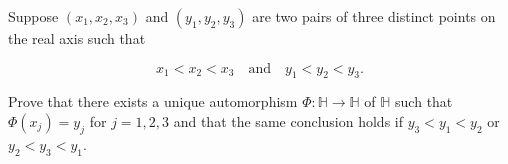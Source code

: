 Suppose $(x_1, x_2, x_3)$ and $(y_1, y_2, y_3)$ are two pairs of three distinct points on the real axis such that

$$
x_1 < x_2 < x_3 \quad \text{and} \quad y_1 < y_2 < y_3.
$$

Prove that there exists a unique automorphism $\Phi : \mathbb{H} \to \mathbb{H}$ of $\mathbb{H}$ such that 
$\Phi(x_j) = y_j$ for $j = 1, 2, 3$ and that the same conclusion holds if $y_3 < y_1 < y_2$ or $y_2 < y_3 < y_1$.

\begin{solution}
  \ \\
\end{solution}